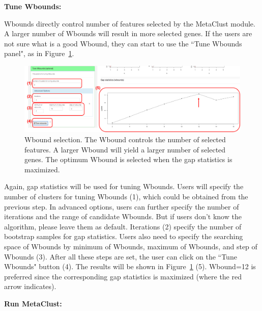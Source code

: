 \begin{steps}
\item \textbf{Tune Wbounds:} 

Wbounds directly control number of features selected by the MetaClust module.
A larger number of Wbounds will result in more selected genes.
If the users are not sure what is a good Wbound,
they can start to use the ``Tune Wbounds panel", 
as in Figure~\ref{fig:metaClusttuneW}.
\begin{figure}[H]
\begin{center}
\includegraphics[scale=0.5]{./figure/metaClust/tuneW.pdf}
\caption{Wbound selection.
The Wbound controls the number of selected features.
A larger Wbound will yield a larger number of selected genes.
The optimum Wbound is selected when the gap statistics is maximized.
}
\label{fig:metaClusttuneW}
\end{center}
\end{figure}
Again,
gap statistics will be used for tuning Wbounds.
Users will specify the number of clusters for tuning Wbounds {\color{red} (1)}, which could be obtained from the previous step.
In advanced options, users can further specify the number of iterations and the range of candidate Wbounds.
But if users don't know the algorithm, please leave them as default.
Iterations {\color{red} (2)} specify the number of bootstrap samples for gap statistics.
Users also need to specify the searching space of Wbounds by minimum of Wbounds, maximum of Wbounds, and step of Wbounds {\color{red} (3)}.
After all these steps are set,
the user can click on the ``Tune Wbounds" button {\color{red} (4)}.
The results will be shown in Figure~\ref{fig:metaClusttuneW} {\color{red} (5)}.
Wbound=12 is preferred since the corresponding gap statistics is maximized (where the red arrow indicates).

\item \textbf{Run MetaClust:} 


\end{steps}
